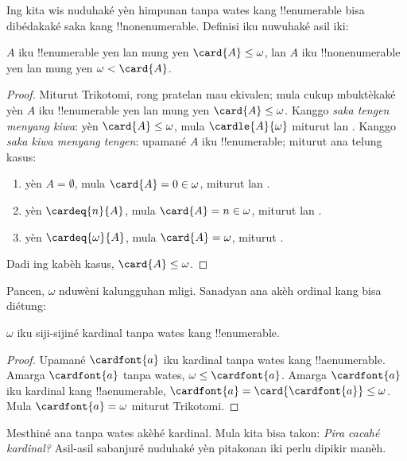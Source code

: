 \documentclass[../../../include/open-logic-section]{subfiles}
\begin{document}
Ing  kita wis nuduhaké
yèn himpunan tanpa wates kang !!{enumerable} bisa dibédakaké
saka kang !!{nonenumerable}. Definisi iku nuwuhaké asil iki:

\begin{prop}
$A$ iku !!{enumerable} yen lan mung yen $\card{A} \leq \omega$,
lan $A$ iku !!{nonenumerable} yen lan mung yen $\omega < \card{A}$.
\end{prop}

\begin{proof}
Miturut Trikotomi, rong pratelan mau ekivalen; mula cukup
mbuktèkaké yèn $A$ iku !!{enumerable} yen lan mung yen
$\card{A} \leq \omega$. Kanggo
\emph{saka tengen menyang kiwa}: yèn $\card{A} \leq \omega$, mula
$\cardle{A}{\omega}$ miturut
 lan
. Kanggo \emph{saka kiwa menyang tengen}:
upamané $A$ iku !!{enumerable}; miturut
 ana telung kasus:
\begin{enumerate}
	\item yèn $A = \emptyset$, mula $\card{A} = 0 \in \omega$, miturut
	 lan
	.
	\item yèn $\cardeq{n}{A}$, mula $\card{A} = n \in \omega$, miturut
	 lan
	.
	\item yèn $\cardeq{\omega}{A}$, mula $\card{A} = \omega$, miturut .
\end{enumerate}
Dadi ing kabèh kasus, $\card{A} \leq \omega$.
\end{proof}
\noindent
Pancen, $\omega$ nduwèni kalungguhan mligi. Sanadyan ana
akèh ordinal kang bisa diétung:

\begin{cor}
$\omega$ iku siji-sijiné kardinal tanpa wates kang !!{enumerable}.
\end{cor}

\begin{proof}
Upamané $\cardfont{a}$ iku kardinal tanpa wates kang !!a{enumerable}. Amarga
$\cardfont{a}$ tanpa wates, $\omega \leq \cardfont{a}$. Amarga
$\cardfont{a}$ iku kardinal kang !!a{enumerable}, $\cardfont{a} =
\card{\cardfont{a}} \leq \omega$. Mula $\cardfont{a} = \omega$ miturut
Trikotomi. \end{proof}

Mesthiné ana tanpa wates akèhé kardinal. Mula kita bisa takon:
\emph{Pira cacahé kardinal?} Asil-asil sabanjuré nuduhaké
yèn pitakonan iki perlu dipikir manèh.
\end{document}
